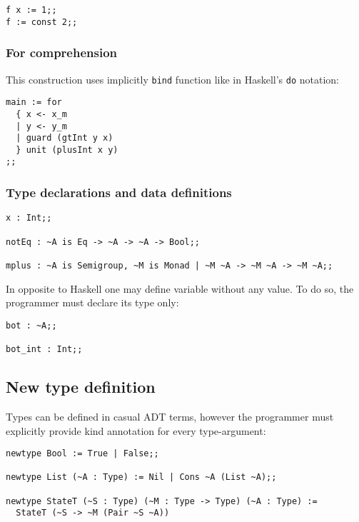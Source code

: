 \documentclass[11pt]{article}
\begin{document}
\begin{verbatim}
f x := 1;;
f := const 2;;
\end{verbatim}

\subsubsection{For comprehension}
\label{sec:orgb414477}
This construction uses implicitly \texttt{bind} function like in Haskell's \texttt{do} notation:

\begin{verbatim}
main := for 
  { x <- x_m
  | y <- y_m
  | guard (gtInt y x)
  } unit (plusInt x y)
;;
\end{verbatim}

\subsubsection{Type declarations and data definitions}
\label{sec:org9767133}

\begin{verbatim}
x : Int;;

notEq : ~A is Eq -> ~A -> ~A -> Bool;;

mplus : ~A is Semigroup, ~M is Monad | ~M ~A -> ~M ~A -> ~M ~A;;
\end{verbatim}

In opposite to Haskell one may define variable without any value. To do so, the programmer must declare its type only:

\begin{verbatim}
bot : ~A;;

bot_int : Int;;
\end{verbatim}

\subsection{New type definition}
\label{sec:org0b039a0}

Types can be defined in casual ADT terms, however the programmer must explicitly provide kind annotation for every type-argument:

\begin{verbatim}
newtype Bool := True | False;;

newtype List (~A : Type) := Nil | Cons ~A (List ~A);;

newtype StateT (~S : Type) (~M : Type -> Type) (~A : Type) :=
  StateT (~S -> ~M (Pair ~S ~A))
\end{verbatim}
\end{document}
